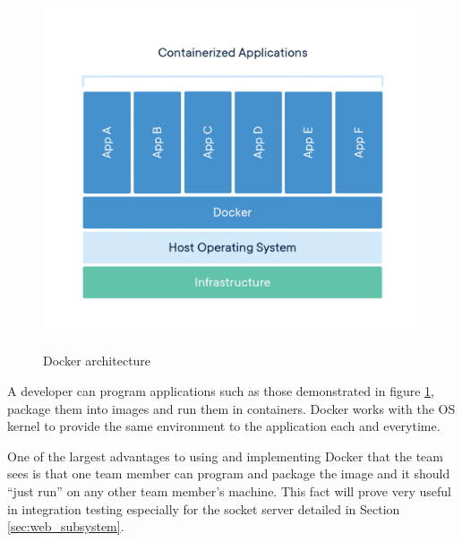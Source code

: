\begin{figure}[H]
    \caption{Docker architecture}
    \centering
    \includegraphics[width=\textwidth]{images/Docker Architecture.png}
    \label{fig:docker_arch}
\end{figure}

A developer can program applications such as those demonstrated in figure \ref{fig:docker_arch}, package them into images and run them in containers. Docker works with the OS kernel to provide the same environment to the application each and everytime.

One of the largest advantages to using and implementing Docker that the team sees is that one team member can program and package the image and it should ``just run'' on any other team member's machine. This fact will prove very useful in integration testing especially for the socket server detailed in Section \ref{sec:web_subsystem}.


